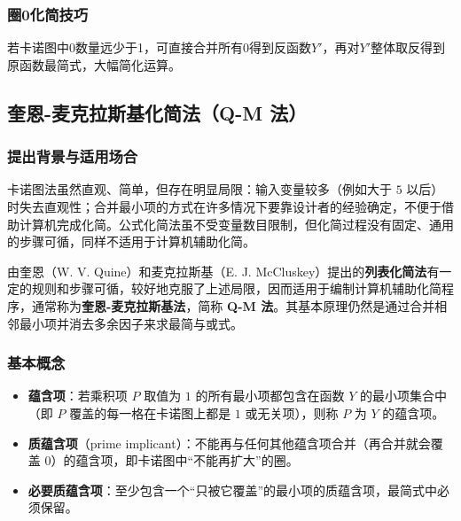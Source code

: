 \subsubsection{圈0化简技巧}
若卡诺图中0数量远少于1，可直接合并所有0得到反函数$Y'$，再对$Y'$整体取反得到原函数最简式，大幅简化运算。

\subsection{奎恩-麦克拉斯基化简法（Q-M 法）}
\subsubsection{提出背景与适用场合}
卡诺图法虽然直观、简单，但存在明显局限：输入变量较多（例如大于 $5$ 以后）时失去直观性；合并最小项的方式在许多情况下要靠设计者的经验确定，不便于借助计算机完成化简。公式化简法虽不受变量数目限制，但化简过程没有固定、通用的步骤可循，同样不适用于计算机辅助化简。

由奎恩（W. V. Quine）和麦克拉斯基（E. J. McCluskey）提出的\textbf{列表化简法}有一定的规则和步骤可循，较好地克服了上述局限，因而适用于编制计算机辅助化简程序，通常称为\textbf{奎恩-麦克拉斯基法}，简称 \textbf{Q-M 法}。其基本原理仍然是通过合并相邻最小项并消去多余因子来求最简与或式。

\subsubsection{基本概念}
\begin{itemize}
    \item \textbf{蕴含项}：若乘积项 $P$ 取值为 $1$ 的所有最小项都包含在函数 $Y$ 的最小项集合中（即 $P$ 覆盖的每一格在卡诺图上都是 $1$ 或无关项），则称 $P$ 为 $Y$ 的蕴含项。
    \item \textbf{质蕴含项}（prime implicant）：不能再与任何其他蕴含项合并（再合并就会覆盖 $0$）的蕴含项，即卡诺图中``不能再扩大''的圈。
    \item \textbf{必要质蕴含项}：至少包含一个``只被它覆盖''的最小项的质蕴含项，最简式中必须保留。
\end{itemize}

